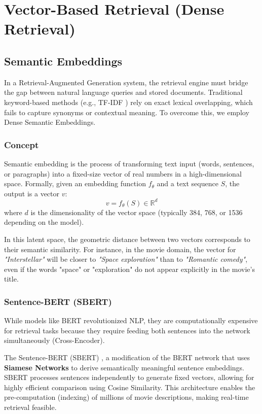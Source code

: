 \documentclass[a4paper, 12pt]{extreport}
\begin{document}
\section{Vector-Based Retrieval (Dense Retrieval)}
\label{sec:vector_retrieval}
    \subsection{Semantic Embeddings}
    In a Retrieval-Augmented Generation system, the retrieval engine must bridge the gap between natural language queries and stored documents. Traditional keyword-based methods (e.g., TF-IDF \cite{tfidf}) rely on exact lexical overlapping, which fails to capture synonyms or contextual meaning. To overcome this, we employ Dense Semantic Embeddings.

\subsubsection{Concept}
Semantic embedding is the process of transforming text input (words, sentences, or paragraphs) into a fixed-size vector of real numbers in a high-dimensional space. Formally, given an embedding function $f_\theta$ and a text sequence $S$, the output is a vector $v$:
\begin{equation}
    v = f_\theta(S) \in \mathbb{R}^d
\end{equation}
where $d$ is the dimensionality of the vector space (typically 384, 768, or 1536 depending on the model).



In this latent space, the geometric distance between two vectors corresponds to their semantic similarity. For instance, in the movie domain, the vector for \textit{"Interstellar"} will be closer to \textit{"Space exploration"} than to \textit{"Romantic comedy"}, even if the words "space" or "exploration" do not appear explicitly in the movie's title.

\subsubsection{Sentence-BERT (SBERT)}
While models like BERT \cite{devlin-etal-2019-bert} revolutionized NLP, they are computationally expensive for retrieval tasks because they require feeding both sentences into the network simultaneously (Cross-Encoder). 

The Sentence-BERT (SBERT) \cite{sbert}, a modification of the BERT network that uses \textbf{Siamese Networks} to derive semantically meaningful sentence embeddings. SBERT processes sentences independently to generate fixed vectors, allowing for highly efficient comparison using Cosine Similarity. This architecture enables the pre-computation (indexing) of millions of movie descriptions, making real-time retrieval feasible.
\end{document}
